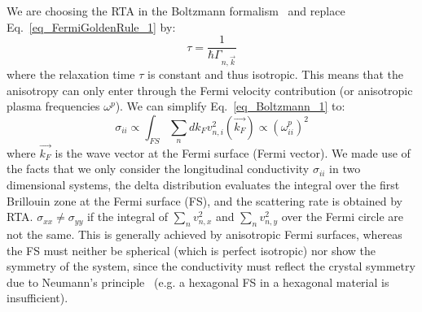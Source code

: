 \documentclass[prb,showpacs,amsmath,amssymb,superscriptaddress,twocolumn,floatfix]{revtex4-1}
\begin{document}
We are choosing the RTA in the Boltzmann formalism~\cite{Vyborny:2009_a} and replace Eq.~\ref{eq_FermiGoldenRule_1} by:
\begin{equation}
	\tau = \frac{1}{\hbar \Gamma_{n, \vec{k}}}
\end{equation}
where the relaxation time $\tau$ is constant and thus isotropic. This
means that the anisotropy can only enter through the Fermi velocity
contribution (or anisotropic plasma frequencies $\omega^p$). We can simplify Eq.~\ref{eq_Boltzmann_1} to:
%
\begin{equation}
	\sigma_{ii} \propto \int_ {FS} \sum_n   dk_F  v^2_{n,i}(\vec{k_F})
	\propto (\omega_{ii}^p)^2
	\label{eq_Boltzmann_2}
\end{equation}
%
where $\vec{k_F}$ is the wave vector at the Fermi surface (Fermi
vector).
We made use of the facts that we only consider the
longitudinal conductivity $\sigma_{ii}$ in two dimensional systems,
the delta distribution evaluates the integral over the first Brillouin
zone at the Fermi surface (FS), and the scattering rate is obtained by
RTA. $\sigma_{xx} \neq \sigma_{yy}$ if the integral of $\sum_n
v^2_{n,x}$ and $\sum_n v^2_{n,y}$ over the Fermi circle are not the
same. This is generally achieved by anisotropic Fermi surfaces,
whereas the FS must neither be spherical (which is perfect isotropic)
nor show the symmetry of the system, since the conductivity must
reflect the crystal symmetry due to Neumann's
principle~\cite{Ritzinger:2021} (e.g. a hexagonal FS in a hexagonal
material is insufficient). \\
\end{document}
